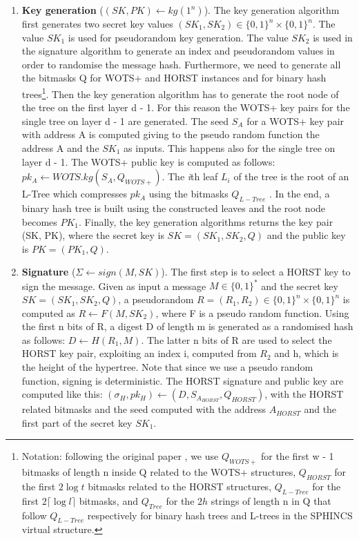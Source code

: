 \documentclass[a4paper,12pt]{article}
\begin{document}
\begin{enumerate}
    \item \textbf{Key generation} ($(SK, PK) \gets kg(1^{n})$). The key generation algorithm first generates two secret key values $(SK_{1} , SK_{2}) \in \{0, 1\}^{n} \times \{0, 1\}^{n}$.
    The value $SK_{1}$ is used for pseudorandom key generation. The value $SK_{2}$ is used in the signature algorithm to generate an index and pseudorandom values in order to randomise the message hash.
    Furthermore, we need to generate all the bitmasks Q for WOTS+ and HORST instances and for binary hash trees\footnote{Notation: following the original paper \cite{1_sphincspaper}, we use $Q_{WOTS+}$ for the first w - 1 bitmasks of length n inside Q related to the WOTS+ structures, $Q_{HORST}$ for the first $2\log t$ bitmasks related to the HORST structures, $Q_{L-Tree}$ for the first $2\lceil \log l\rceil$ bitmasks, and $Q_{Tree}$ for the $2h$ strings of length n in Q that follow $Q_{L-Tree}$ respectively for binary hash trees and L-trees in the SPHINCS virtual structure.}.
    Then the key generation algorithm has to generate the root node of the tree on the first layer d - 1.
    For this reason the WOTS+ key pairs for the single tree on layer d - 1 are generated. The seed $S_{A}$ for a WOTS+ key pair with address A is computed giving to the pseudo random function the address A and the $SK_{1}$ as inputs. This happens also for the single tree on layer d - 1.
    The WOTS+ public key is computed as follows:
    $pk_{A} \gets WOTS.kg(S_{A} , Q_{WOTS+})$.
    The \textit{i}th leaf $L_{i}$ of the tree is the root of an L-Tree which compresses $pk_{A}$ using the bitmasks $Q_{L-Tree}$ . In the end, a binary hash tree is built using the constructed leaves and the root node becomes $PK_{1}$.
    Finally, the key generation algorithms returns the key pair (SK, PK), where the secret key is $SK = (SK_{1}, SK_{2}, Q)$ and the public key is $PK = (PK_{1}, Q)$.
    \item \textbf{Signature} ($ \Sigma \gets sign(M, SK)$). The first step is to select a HORST key to sign the message.
    Given as input a message $M \in \{0, 1\}^{*}$ and the secret key $SK=(SK_{1}, SK_{2}, Q)$, a pseudorandom $R=(R_{1}, R_{2}) \in \{0,1\}^{n} \times \{0,1\}^{n}$ is computed as $R \gets F(M, SK_{2})$, where F is a pseudo random function. Using the first n bits of R, a digest D of length m is generated as a randomised hash as follows: $D \gets H(R_{1}, M)$. The latter n bits of R are used to select the HORST key pair, exploiting an index i, computed from $R_{2}$ and h, which is the height of the hypertree. Note that since we use a pseudo random function, signing is deterministic. The HORST signature and public key are computed like this: $(\sigma_{H}, pk_{H}) \gets (D, S_{A_{HORST}}, Q_{HORST})$, with the HORST related bitmasks and the seed computed with the address $A_{HORST}$ and the first part of the secret key $SK_{1}$.

\end{enumerate}
\end{document}
